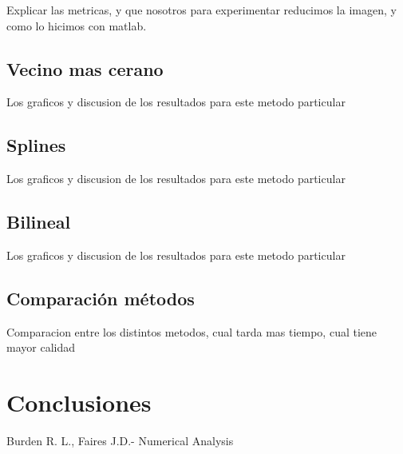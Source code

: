 \documentclass[a4paper]{article}
\begin{document}
Explicar las metricas, y que nosotros para experimentar reducimos la imagen, y como lo hicimos con matlab.

\subsection{Vecino mas cerano}

Los graficos y discusion de los resultados para este metodo particular

\subsection{Splines}

Los graficos y discusion de los resultados para este metodo particular

\subsection{Bilineal}

Los graficos y discusion de los resultados para este metodo particular

\subsection{Comparación métodos}

Comparacion entre los distintos metodos, cual tarda mas tiempo, cual tiene mayor calidad


\section{Conclusiones}

\begin{thebibliography}{abbrvnat}
 Burden R. L., Faires J.D.- Numerical Analysis
\end{thebibliography}
\end{document}
